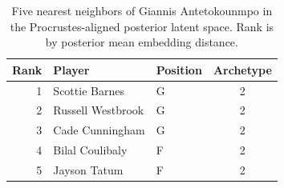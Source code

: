 \begin{table}[htbp]
  \centering\small
  \begin{tabular}{rllc}
    \toprule
    Rank & Player & Position & Archetype \\
    \midrule
    1 & Scottie Barnes & G & 2 \\
    2 & Russell Westbrook & G & 2 \\
    3 & Cade Cunningham & G & 2 \\
    4 & Bilal Coulibaly & F & 2 \\
    5 & Jayson Tatum & F & 2 \\
    \bottomrule
  \end{tabular}
  \caption{Five nearest neighbors of Giannis Antetokounmpo in the Procrustes-aligned posterior latent space. Rank is by posterior mean embedding distance.}
  \label{tab:Giannis_Antetokounmpo_neighbors}
\end{table}

